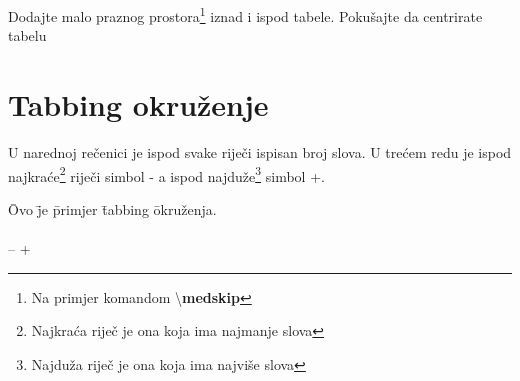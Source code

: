 \documentclass[12pt, twocolumn, a4paper]{article}
\begin{document}
Dodajte malo praznog prostora\footnote{Na primjer komandom \textbackslash \textbf{medskip}} iznad i ispod tabele. Pokušajte da centrirate tabelu
\section{Tabbing okruženje}
U narednoj rečenici je ispod svake riječi ispisan broj slova. U trećem redu je ispod najkraće\footnote{Najkraća riječ je ona koja ima najmanje slova} riječi simbol - a ispod najduže\footnote{Najduža riječ je ona koja ima najviše slova} simbol +.
\begin{tabbing}
	\=Ovo \=je \=primjer \=tabbing \=okruženja.\\
	  \>7   \\
	\> \>-- \> \> \>+
\end{tabbing}
\end{document}

